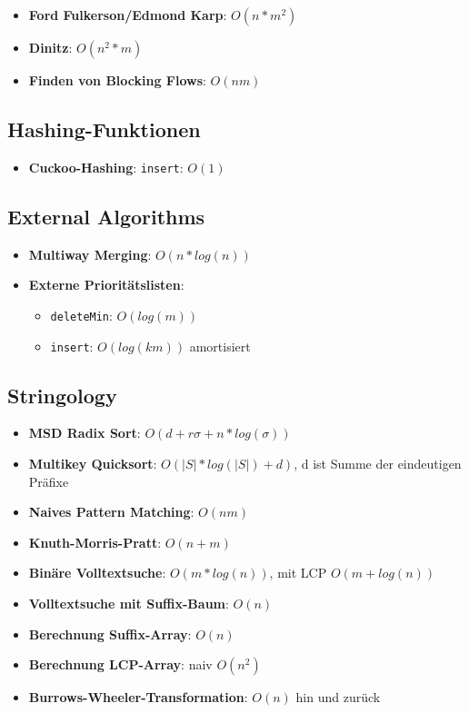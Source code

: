\begin{itemize}
	\item \textbf{Ford Fulkerson/Edmond Karp}: $O(n * m^2)$
	\item \textbf{Dinitz}: $O(n^2 * m)$
	\item \textbf{Finden von Blocking Flows}: $O(nm)$
\end{itemize}

\subsection{Hashing-Funktionen}%
\label{lz:sub:hashing_funktionen}

\begin{itemize}
	\item \textbf{Cuckoo-Hashing}: \texttt{insert}: $O(1)$
\end{itemize}

\subsection{External Algorithms}%
\label{lz:sub:external_algorithms}

\begin{itemize}
	\item \textbf{Multiway Merging}: $O(n * log (n))$
	\item \textbf{Externe Prioritätslisten}:
	\begin{itemize}
		\item \texttt{deleteMin}: $O(log (m))$
		\item \texttt{insert}: $O(log (km))$ amortisiert
	\end{itemize}
\end{itemize}

\subsection{Stringology}%
\label{lz:sub:stringology}

\begin{itemize}
	\item \textbf{MSD Radix Sort}: $O(d + r\sigma + n * log (\sigma))$
	\item \textbf{Multikey Quicksort}: $O(|S| * log(|S|) + d)$, d ist Summe der eindeutigen Präfixe
	\item \textbf{Naives Pattern Matching}: $O(nm)$
	\item \textbf{Knuth-Morris-Pratt}: $O(n + m)$
	\item \textbf{Binäre Volltextsuche}: $O(m * log (n))$, mit LCP $O(m + log (n))$
	\item \textbf{Volltextsuche mit Suffix-Baum}: $O(n)$
	\item \textbf{Berechnung Suffix-Array}: $O(n)$
	\item \textbf{Berechnung LCP-Array}: naiv $O(n^2)$
	\item \textbf{Burrows-Wheeler-Transformation}: $O(n)$ hin und zurück
\end{itemize}

